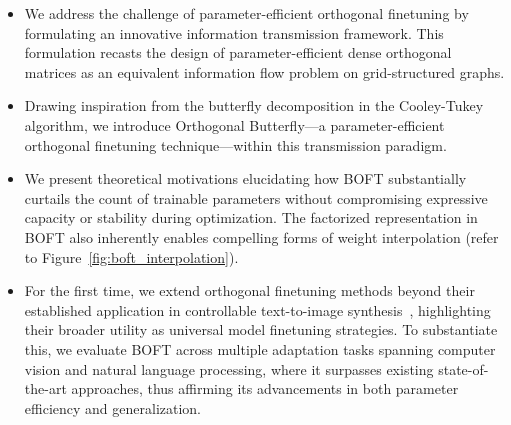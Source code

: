 \begin{itemize}[leftmargin=*,nosep]
    \item We address the challenge of parameter-efficient orthogonal finetuning by formulating an innovative information transmission framework. This formulation recasts the design of parameter-efficient dense orthogonal matrices as an equivalent information flow problem on grid-structured graphs.
    \item Drawing inspiration from the butterfly decomposition in the Cooley-Tukey algorithm, we introduce Orthogonal Butterfly—a parameter-efficient orthogonal finetuning technique—within this transmission paradigm.
    \item We present theoretical motivations elucidating how BOFT substantially curtails the count of trainable parameters without compromising expressive capacity or stability during optimization. The factorized representation in BOFT also inherently enables compelling forms of weight interpolation (refer to Figure~\ref{fig:boft_interpolation}).
    \item For the first time, we extend orthogonal finetuning methods beyond their established application in controllable text-to-image synthesis~\cite{qiu2023controlling}, highlighting their broader utility as universal model finetuning strategies. To substantiate this, we evaluate BOFT across multiple adaptation tasks spanning computer vision and natural language processing, where it surpasses existing state-of-the-art approaches, thus affirming its advancements in both parameter efficiency and generalization.
\end{itemize}

